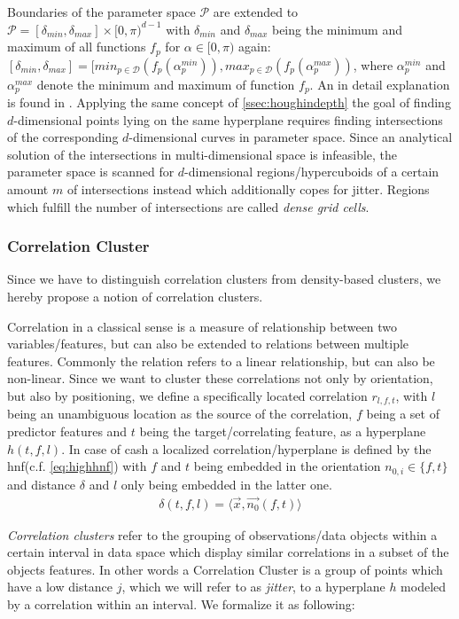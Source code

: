 Boundaries of the parameter space $\mathcal{P}$ are extended to $\mathcal{P} = [\delta_{min}, \delta_{max}]\times [0,\pi)^{d-1}$ with $\delta_{min}$ and $\delta_{max}$ being the minimum and maximum of all functions $f_p$ for $\alpha \in [0,\pi)$ again: $[\delta_{min}, \delta_{max}] = [min_{p \in \mathcal{D}}(f_p(\alpha_p^{min})), max_{p \in \mathcal{D}}(f_p(\alpha_p^{max}))$, where $\alpha_p^{min}$ and $\alpha_p^{max}$ denote the minimum and maximum of function $f_p$. An in detail explanation is found in \textcite{CASHachtert2008robust}.
Applying the same concept of \autoref{ssec:houghindepth} the goal of finding $d$-dimensional points lying on the same hyperplane requires finding intersections of the corresponding $d$-dimensional curves in parameter space. Since an analytical solution of the intersections in multi-dimensional space is infeasible, the parameter space is scanned for $d$-dimensional regions/hypercuboids of a certain amount $m$ of intersections instead which additionally copes for jitter. Regions which fulfill the number of intersections are called \textit{dense grid cells}.

\subsubsection*{Correlation Cluster}
Since we have to distinguish correlation clusters from density-based clusters, we hereby propose a notion of correlation clusters.

Correlation in a classical sense is a measure of relationship between two variables/features, but can also be extended to relations between multiple features. Commonly the relation refers to a linear relationship, but can also be non-linear. Since we want to cluster these correlations not only by orientation, but also by positioning, we define a specifically located correlation $r_{l,f,t}$, with $l$ being an unambiguous location as the source of the correlation, $f$ being a set of predictor features and $t$ being the target/correlating feature, as a hyperplane $h(t,f,l)$. In case of \gls{cash} a localized correlation/hyperplane is defined by the \gls{hnf}(c.f. \autoref{eq:highhnf}) with $f$ and $t$ being embedded in the orientation $n_{0,i} \in \{f,t\}$ and distance $\delta$ and $l$ only being embedded in the latter one. 
\begin{align}
    \delta(t,f,l) = \langle \vec{x},\vec{n_0}(f,t) \rangle
\end{align}

\textit{Correlation clusters} refer to the grouping of observations/data objects within a certain interval in data space which display similar correlations in a subset of the objects features. In other words a Correlation Cluster is a group of points which have a low distance $j$, which we will refer to as \textit{jitter}, to a hyperplane $h$ modeled by a correlation within an interval. We formalize it as following:

